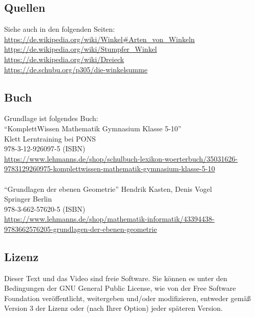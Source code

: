 \documentclass[a4paper]{amsart}
\theoremstyle{definition}
\begin{document}
\subsection*{Quellen}
Siehe auch in den folgenden Seiten:\\
\url{https://de.wikipedia.org/wiki/Winkel#Arten_von_Winkeln}\\
\url{https://de.wikipedia.org/wiki/Stumpfer_Winkel}\\
\url{https://de.wikipedia.org/wiki/Dreieck}\\
\url{https://de.schubu.org/p305/die-winkelsumme}

\subsection*{Buch}
Grundlage ist folgendes Buch:\\

"`KomplettWissen Mathematik Gymnasium Klasse 5-10"'\\
Klett Lerntraining bei PONS\\
978-3-12-926097-5 (ISBN)\\
{\tiny
   \url{https://www.lehmanns.de/shop/schulbuch-lexikon-woerterbuch/35031626-9783129260975-komplettwissen-mathematik-gymnasium-klasse-5-10
   }
}\\
\\
"`Grundlagen der ebenen Geometrie"'
Hendrik Kasten, Denis Vogel\\
Springer Berlin\\
978-3-662-57620-5 (ISBN)\\
{\tiny
   \url{
      https://www.lehmanns.de/shop/mathematik-informatik/43394438-9783662576205-grundlagen-der-ebenen-geometrie
   }
}

\subsection*{Lizenz}
Dieser Text und das Video sind freie Software. Sie können es unter den Bedingungen der 
GNU General Public License, wie von der Free Software Foundation veröffentlicht, weitergeben 
und/oder modifizieren, entweder gemäß Version 3 der Lizenz oder (nach Ihrer Option) jeder späteren Version.
\end{document}
